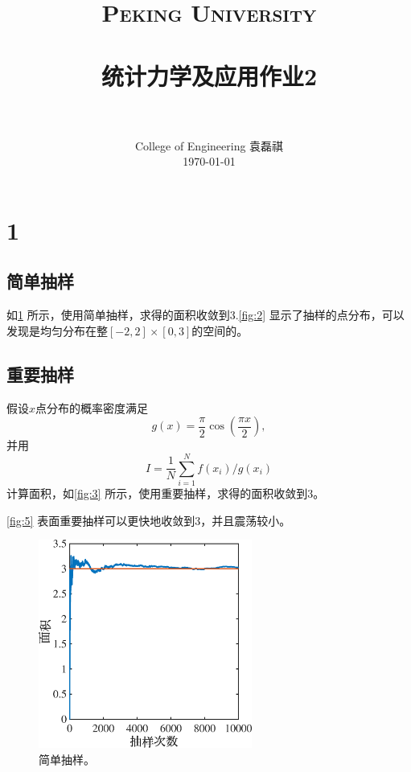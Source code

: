 \documentclass[12pt]{article}
\title{
		\vspace{-1in} 	
		\usefont{OT1}{bch}{b}{n}
		\normalfont \normalsize \textsc{\LARGE Peking University}\\[1cm] %
		\horrule{0.5pt} \\[0.5cm]
		\huge \bfseries{统计力学及应用作业2} \\
		\horrule{2pt} \\[0.5cm]
}
\author{
		\normalfont 								\normalsize
		College of Engineering \quad 2001111690  \quad 袁磊祺\\	\normalsize
        \today
}
\date{}
\begin{document}


\maketitle

\section{1}

\subsection{简单抽样}

如\cref{fig:1} 所示，使用简单抽样，求得的面积收敛到3.\cref{fig:2} 显示了抽样的点分布，可以发现是均匀分布在整$[-2,2]\times [0,3]$的空间的。

\subsection{重要抽样}

假设$x$点分布的概率密度满足
\begin{equation}
	g(x) = \frac{\pi}{2} \cos \left(\frac{\pi x}{2}\right),
\end{equation}
并用
\begin{equation}
	I = \frac{1}{N} \sum_{i=1}^N f(x_i)/g(x_i)
\end{equation}
计算面积，如\cref{fig:3} 所示，使用重要抽样，求得的面积收敛到3。

\cref{fig:5} 表面重要抽样可以更快地收敛到3，并且震荡较小。

\begin{figure}[htp]
	\centering
	\includegraphics[width=7cm]{1.eps}
	\caption{简单抽样。}
	\label{fig:1}
\end{figure}
\end{document}

